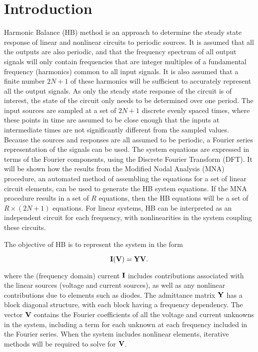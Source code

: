 %
%
\section{Introduction}

Harmonic Balance (HB) method is an approach to determine the steady state response of linear and nonlinear circuits to periodic sources.
It is assumed that all the outputs are also periodic, and that the frequency spectrum of all output signals will only contain frequencies that are integer multiples of a fundamental frequency (harmonics) common to all input signals.
It is also assumed that a finite number \( 2 N + 1 \) of these harmonics will be sufficient to accurately represent all the output signals.
As only the steady state response of the circuit is of interest, the state of the circuit only needs to be determined over one period.
The input sources are sampled at a set of \( 2 N + 1 \) discrete evenly spaced times, where these points in time are assumed to be close enough that the inputs at intermediate times are not significantly different from the sampled values.
Because the sources and responses are all assumed to be periodic, a Fourier series representation of the signals can be used.
The system equations are expressed in terms of the Fourier components, using the Discrete Fourier Transform (DFT).  It will be shown how the results from the Modified Nodal Analysis (MNA) procedure, an automated method of assembling the equations for a set of linear circuit elements, can be used to generate the HB system equations.  If the MNA procedure results in a set of \( R \) equations, then the HB equations will be a set of \( R \times (2 N + 1) \) equations.  
For linear systems, HB can be interpreted as an independent circuit for each frequency, with nonlinearities in the system coupling these circuits.

The objective of HB is to represent the system in the form

\begin{equation}\label{eqn:ece1254projectReport:560}
\BI(\BV) = \BY \BV.
\end{equation}

where the (frequency domain) current \( \mathbf{I} \) includes contributions associated with the linear sources (voltage and current sources), as well as any nonlinear contributions due to elements such as diodes.
The admittance matrix \( \mathbf{Y} \) has a block diagonal structure, with each block having a frequency dependency.
The vector \( \mathbf{V} \) contains the Fourier coefficients of all the voltage and current unknowns in the system, including a term for each unknown at each frequency included in the Fourier series.
When the system includes nonlinear elements, iterative methods will be required to solve for \( \mathbf{V} \).


